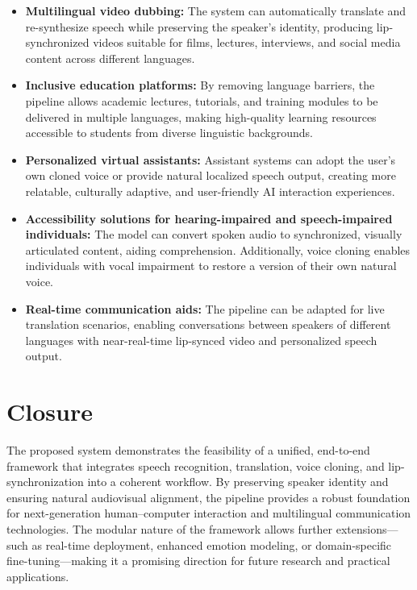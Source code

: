 \documentclass[12pt,oneside]{report}
\begin{document}
\begin{itemize}
    \item \textbf{Multilingual video dubbing:}  
    The system can automatically translate and re-synthesize speech while preserving the speaker’s identity, producing lip-synchronized videos suitable for films, lectures, interviews, and social media content across different languages.

    \item \textbf{Inclusive education platforms:}  
    By removing language barriers, the pipeline allows academic lectures, tutorials, and training modules to be delivered in multiple languages, making high-quality learning resources accessible to students from diverse linguistic backgrounds.

    \item \textbf{Personalized virtual assistants:}  
    Assistant systems can adopt the user’s own cloned voice or provide natural localized speech output, creating more relatable, culturally adaptive, and user-friendly AI interaction experiences.

    \item \textbf{Accessibility solutions for hearing-impaired and speech-impaired individuals:}  
    The model can convert spoken audio to synchronized, visually articulated content, aiding comprehension. Additionally, voice cloning enables individuals with vocal impairment to restore a version of their own natural voice.

    \item \textbf{Real-time communication aids:}  
    The pipeline can be adapted for live translation scenarios, enabling conversations between speakers of different languages with near-real-time lip-synced video and personalized speech output.
\end{itemize}

\section{Closure}

The proposed system demonstrates the feasibility of a unified, end-to-end framework that integrates speech recognition, translation, voice cloning, and lip-synchronization into a coherent workflow. By preserving speaker identity and ensuring natural audiovisual alignment, the pipeline provides a robust foundation for next-generation human–computer interaction and multilingual communication technologies. The modular nature of the framework allows further extensions—such as real-time deployment, enhanced emotion modeling, or domain-specific fine-tuning—making it a promising direction for future research and practical applications.
\end{document}
